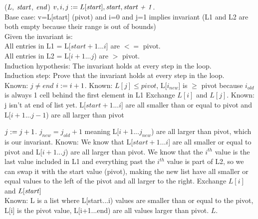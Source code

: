 \begin{problem}
\begin{questions}
\begin{myalgo}{($L$, $\textit{start\/}$, $\textit{end\/}$)}
    \STATE $v, i, j := L[\textit{start\/}], \textit{start\/}, \textit{start + 1\/}$.\\
    Base case: v=L[start] (pivot) and i=0 and j=1 implies invariant (L1 and L2 are both empty because their range is out of bounds) \\
    Given the invariant is: \\
    All entries in L1 = L[$start+1$...$i$] are $<=$ pivot.\\
    All entries in L2 = L[$i + 1$...$j$) are $>$ pivot.\\
    Induction hypothesis: The invariant holds at every step in the loop.\\
    Induction step: Prove that the invariant holds at every step in the loop.\\
    \label{alg:while}
    \STATE Known: $j \neq end$
            \STATE $i := i + 1$.
            \STATE Known: $L[j] \leq pivot$, L[$i_{new}$] is $\geq$ pivot because $i_{old}$ is always 1 cell behind the first element in L1
            \STATE Exchange $L[i]$ and $L[j]$.
            \STATE Known: j isn't at end of list yet. L[$start+1$...$i$] are all smaller than or equal to pivot and L[$i + 1$...$j-1$) are all larger than pivot 
    
        \ENDIF
        \STATE $j := j + 1$.
        \STATE $j_{new} = j_{old} + 1$ meaning L[$i + 1$...$j_{new}$) are all larger than pivot, which is our invariant.
    \ENDWHILE
    \STATE Known: We know that L[$start+1$...$i$] are all smaller or equal to pivot and L[$i + 1$...$j$) are all larger than pivot. We know that the $i^{th}$ value is the last value included in L1 and everything past the $i^{th}$ value is part of L2, so we can swap it with the start value (pivot), making the new list have all smaller or equal values to the left of the pivot and all larger to the right.
    \STATE Exchange $L[i]$ and $L[\textit{start\/}]$
    \\Known: L is a list where L[start...i) values are smaller than or equal to the pivot, L[i] is the pivot value, L[i+1...end) are all values larger than pivot.
    \RETURN $L$.
\end{myalgo}


\end{questions}
\end{problem}
